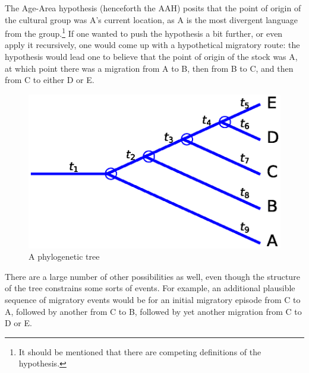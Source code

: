 \documentclass[11pt]{article}
\begin{document}
The Age-Area hypothesis (henceforth the AAH) posits that the point of origin of the cultural group was A's current location, as A is the most divergent language from the group.\footnote{It should be mentioned that there are competing definitions of the hypothesis.} If one wanted to push the hypothesis a bit further, or even apply it recursively, one would come up with a hypothetical migratory route: the hypothesis would lead one to believe that the point of origin of the stock was A, at which point there was a migration from A to B, then from B to C, and then from C to either D or E.

\begin{figure}
\begin{center}
\includegraphics[width=\textwidth]{AncillaryFiles//figure1.eps}
\caption{A phylogenetic tree} \label{fig1}
\end{center} 
\end{figure}

There are a large number of other possibilities as well, even though the structure of the tree constrains some sorts of events. For example, an additional plausible sequence of migratory events would be for an initial migratory episode from C to A, followed by another from C to B, followed by yet another migration from C to D or E.
\end{document}
